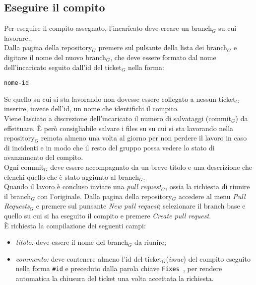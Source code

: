 \subsection{Eseguire il compito}
Per eseguire il compito assegnato, l'incaricato deve creare un branch$_G$ su cui lavorare. \\
Dalla pagina della repository$_G$ premere sul pulsante della lista dei branch$_G$ e digitare il nome del nuovo branch$_G$, che deve essere formato dal nome dell'incaricato seguito dall'id del ticket$_G$ nella forma: 
\begin{verbatim}
nome-id
\end{verbatim}
Se quello su cui si sta lavorando non dovesse essere collegato a nessun ticket$_G$ inserire, invece dell'id, un nome che identifichi il compito. \\
Viene lasciato a discrezione dell'incaricato il numero di salvataggi (commit$_G$) da effettuare. È però consigliabile salvare i files su su cui si sta lavorando nella repository$_G$ remota almeno una volta al giorno per non perdere il lavoro in caso di incidenti e in modo che il resto del gruppo possa vedere lo stato di avanzamento del compito. \\
Ogni commit$_G$ deve essere accompagnato da un breve titolo e una descrizione che elenchi quello che è stato aggiunto al branch$_G$. \\
Quando il lavoro è concluso inviare una \textit{pull request}$_G$, ossia la richiesta di riunire il branch$_G$ con l'originale. Dalla pagina della repository$_G$ accedere al menu \textit{Pull Requests}$_G$ e premere sul punsante \textit{New pull request}; selezionare il branch base e quello su cui si ha eseguito il compito e premere \textit{Create pull request}.\\ È richiesta la compilazione dei seguenti campi:
\begin{itemize}
    \item \textit{titolo:} deve essere il nome del branch$_G$ da riunire;
    \item \textit{commento:} deve contenere almeno l'id del ticket$_G$(\textit{issue}) del compito eseguito nella forma \texttt{\#id} e preceduto dalla parola chiave \texttt{Fixes }, per rendere automatica la chiusura del ticket una volta accettata la richiesta. 
\end{itemize}

